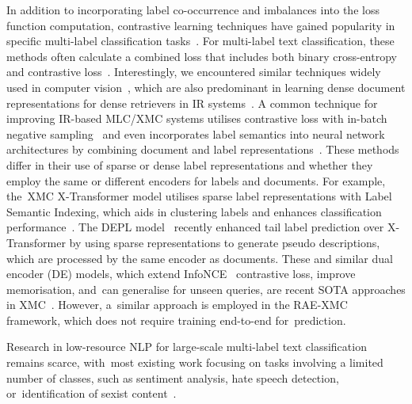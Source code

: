 \documentclass[make,article,accept,pdftex,moreauthors]{Definitions/mdpi}
\begin{document}
In addition to incorporating label co-occurrence and imbalances into the loss function computation, contrastive learning techniques have gained popularity in specific multi-label classification tasks~\citep{piskorski-etal-2023-semeval-task3}. 
For multi-label text classification, these methods often calculate a combined loss that includes both binary cross-entropy and contrastive loss~\citep{liao2023marseclipse, reiterhaas2023mcpt}. 
Interestingly, we encountered similar techniques widely used in computer vision~\citep{tunstall2022efficient, zheng-etal-2022-contrastive}, which are also predominant in learning dense document representations for dense retrievers in IR systems~\citep{reimers-2019-sentence-bert, zhang2024mgte, sturua2024jinaembeddingsv3multilingualembeddingstask, chen2024bgem3embeddingmultilingualmultifunctionality}.
A common technique for improving IR-based MLC/XMC systems utilises contrastive loss with in-batch negative sampling~\citep{dahiya2023ngame} and even incorporates label semantics into neural network architectures by combining document and label representations~\citep{you2019attentionxmllabeltreebasedattentionaware, chang2020tamingpretrainedtransformersextreme, jiang2021lightxmltransformerdynamicnegative}.
These methods differ in their use of sparse or dense label representations and whether they employ the same or different encoders for labels and documents. 
For example, the~XMC X-Transformer model utilises sparse label representations with Label Semantic Indexing, which aids in clustering labels and enhances classification performance~\citep{chang2020tamingpretrainedtransformersextreme}. 
The DEPL model~\citep{zhang2023longtailed} recently enhanced tail label prediction over X-Transformer by using sparse representations to generate pseudo descriptions, which are processed by the same encoder as documents. 
These and similar dual encoder (DE) models, which extend InfoNCE~\citep{oord2019representationlearningcontrastivepredictive} contrastive loss, improve memorisation, and~can generalise for unseen queries, are recent SOTA approaches in XMC~\citep{gupta2024dexml}.
However, a~similar approach is employed in the RAE-XMC~\citep{wang2025retrievalaugmentedencodersextrememultilabel} framework, which does not require training end-to-end for~prediction.

Research in low-resource NLP for large-scale multi-label text classification remains scarce, with~most existing work focusing on tasks involving a limited number of classes, such as sentiment analysis, hate speech detection, or~identification of sexist content~\citep{magueresse2020lowresourcelanguagesreviewpast, pakray2025lowresourcenlp}.
\end{document}

